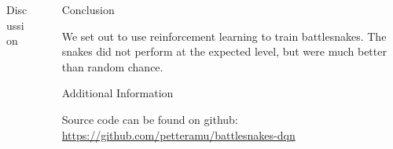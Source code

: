 \documentclass[final]{beamer}
\newlength{\sepwid}
\newlength{\onecolwid}
\newlength{\twocolwid}
\begin{document}
\begin{frame}[t]
\begin{columns}[t]
\begin{column}{\twocolwid}
\begin{columns}[t,totalwidth=\twocolwid]
\begin{column}{\onecolwid}
\begin{block}{Discussion}
\end{block}


\end{column} %

\end{columns} %

\end{column} %

\begin{column}{\sepwid}\end{column} %

\begin{column}{\onecolwid} %


\begin{block}{Conclusion}

We set out to use reinforcement learning to train battlesnakes. 
The snakes did not perform at the expected level, but were much better than random chance. 

\end{block}


\begin{block}{Additional Information}

Source code can be found on github: \href{https://github.com/petteramu/battlesnakes-dqn}{https://github.com/petteramu/battlesnakes-dqn}

\end{block}





\end{column}
\end{columns}
\end{frame}
\end{document}
